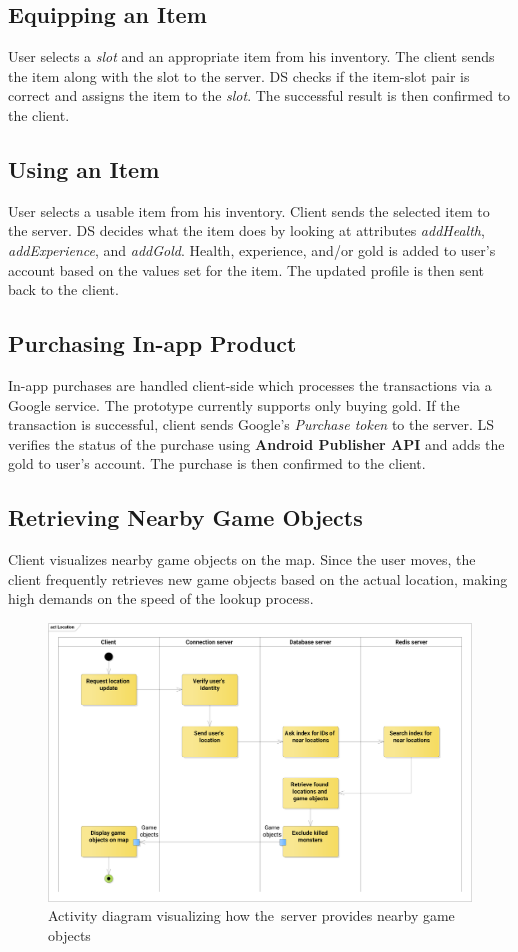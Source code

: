 	\subsection{Equipping an Item}
	User selects a \textit{slot} and an appropriate item from his inventory. The client sends the item along with the slot to the server. DS checks if the item-slot pair is correct and assigns the item to the \textit{slot}. The successful result is then confirmed to the client.
	
	\subsection{Using an Item}
	User selects a usable item from his inventory. Client sends the selected item to the server. DS decides what the item does by looking at attributes \textit{addHealth}, \textit{addExperience}, and \textit{addGold}. Health, experience, and/or gold is added to user's account based on the values set for the item. The updated profile is then sent back to the client.
		
	\subsection{Purchasing In-app Product}
	In-app purchases are handled client-side which processes the transactions via a Google service. The prototype currently supports only buying gold. If the transaction is successful, client sends Google's \textit{Purchase token} to the server. LS verifies the status of the purchase using \textbf{Android Publisher API} \cite{androidpublisher} and adds the gold to user's account. The purchase is then confirmed to the client.

	\subsection{Retrieving Nearby Game Objects}
	Client visualizes nearby game objects on the map. Since the user moves, the client frequently retrieves new game objects based on the actual location, making high demands on the speed of the lookup process.
	
	\begin{figure}[h]	
		\includegraphics[width=\textwidth]{figures/AD_Location}
		\centering			
		\caption{Activity diagram visualizing how the~server provides nearby game objects}
		\label{fig:adlocation}
	\end{figure} 
	
